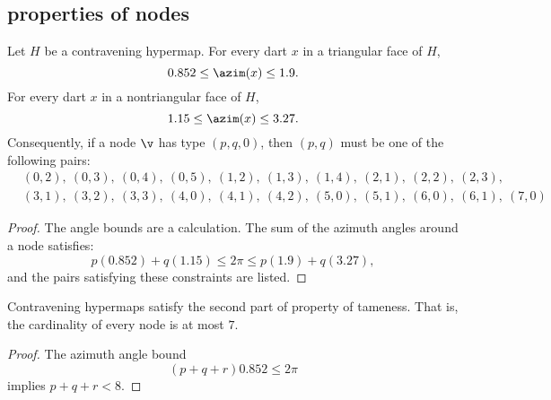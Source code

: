 \subsection{properties of nodes}
%



\begin{lemma} \label{lemma:0.852}
Let $H$ be a contravening
hypermap. For every dart $x$ in a triangular face of $H$,
\begin{displaymath}0.852\le \azim(x)\le 1.9.\end{displaymath}
For every dart $x$ in a nontriangular face of $H$, 
\begin{displaymath}1.15\le\azim(x)\le 3.27.\end{displaymath}
%
%
Consequently, if a node $\v$ has type $(p,q,0)$, then $(p,q)$
must be one of the following pairs:
\begin{displaymath}
\begin{array}{lll}
  &(0,2),~(0,3),~(0,4),~(0,5),~(1,2),~(1,3),~(1,4),~(2,1),~(2,2),~(2,3),\\
  &(3,1),~(3,2),~(3,3),~(4,0),~(4,1),~(4,2),
  ~(5,0),~(5,1),~(6,0),~(6,1),~(7,0)
\end{array}
\end{displaymath}
\end{lemma}
%

\begin{proof}
The angle bounds are a calculation.  The sum of the azimuth angles
around a node satisfies:
\begin{displaymath}
p (0.852) + q (1.15) \le 2\pi \le p (1.9) + q (3.27),
\end{displaymath}
and the pairs satisfying these constraints are listed.
\end{proof}

\begin{lemma}\label{lemma:node-upper}
Contravening hypermaps satisfy the second part of property 
of tameness.  That is, the cardinality of every
node is at most $7$.
\end{lemma}

\begin{proof}  The azimuth angle bound
\begin{displaymath}
(p+q+r) 0.852 \le 2\pi
\end{displaymath}
implies $p+q+r < 8$.
\end{proof}




